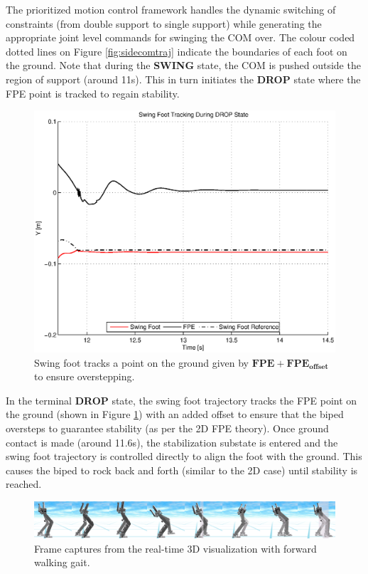 The prioritized motion control framework handles the dynamic switching of constraints (from double support to single support) while generating the appropriate joint level commands for swinging the COM over. The colour coded dotted lines on Figure \ref{fig:sidecomtraj} indicate the boundaries of each foot on the ground. Note that during the \textbf{SWING} state, the COM is pushed outside the region of support (around 11s). This in turn initiates the \textbf{DROP} state where the FPE point is tracked to regain stability.

\begin{figure}[!b]
	\centering
    \includegraphics[scale=0.7]{fig/simulations/sidefpetrack.eps}
  	\caption{Swing foot tracks a point on the ground given by $\mathbf{FPE} + \mathbf{FPE_{offset}}$ to ensure overstepping.}
	\label{fig:sidefpetrack}
\end{figure}


In the terminal \textbf{DROP} state, the swing foot trajectory tracks the FPE point on the ground (shown in Figure \ref{fig:sidefpetrack}) with an added offset to ensure that the biped oversteps to guarantee stability (as per the 2D FPE theory). Once ground contact is made (around 11.6s), the stabilization substate is entered and the swing foot trajectory is controlled directly to align the foot with the ground. This causes the biped to rock back and forth (similar to the 2D case) until stability is reached.

\begin{figure}[!h]
	\centering
    \includegraphics[scale=0.1]{fig/simulations/fwdsequenceside.png}
  	\caption{Frame captures from the real-time 3D visualization with forward walking gait.}
	\label{fig:fwdsequenceside}
\end{figure}

